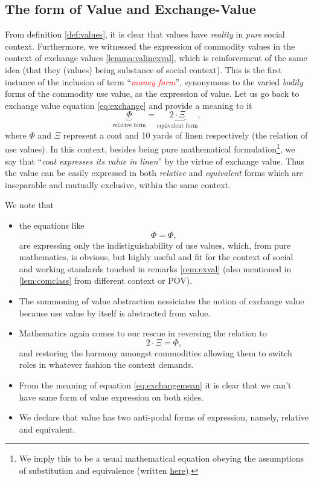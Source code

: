 \documentclass[12pt]{extarticle}
\theoremstyle{definition}
\newenvironment{remark}[1][Remark]{\begin{trivlist}
\item[\hskip \labelsep {\bfseries #1}]}{\end{trivlist}}
\begin{document}
\subsection{The form of Value and Exchange-Value}
From definition \ref{def:values}, it is clear that values have \emph{reality} in \emph{pure} social context.  Furthermore, we witnessed the expression of commodity values in the context of exchange values \ref{lemma:valinexval}, which is reinforcement of the same idea (that they (values) being substance of social context).  This is the first instance of the inclusion of term ``\emph{\textcolor{red}{money form}}'', synonymous to the varied \emph{bodily} forms of the commodity use value,  as the expression of value.  Let us go back to exchange value equation \ref{eq:exchange} and provide a meaning to it
\begin{equation}
  \label{eq:exchangemean}
  \underbrace{\Phi}_{\text{relative form}} = \underbrace{2\cdot\Xi}_{\text{equivalent form}},
\end{equation}
where $\Phi$ and $\Xi$ represent a coat and 10 yards of linen respectively (the relation of use values).  In this context, besides being pure mathematical formulation\footnote{We imply this to be a usual mathematical equation obeying the assumptions of substitution and equivalence (written \href{https://en.wikipedia.org/wiki/Equality_(mathematics)\#Basic_properties}{here}).}, we say that ``\emph{coat expresses its value in linen}'' by the virtue of exchange value.  Thus the value can be easily expressed in both \emph{relative} and \emph{equivalent} forms which are inseparable and mutually exclusive, within the same context.

\begin{remark}
  We note that
  \begin{itemize}
\item the equations like
\begin{equation}
  \label{eq:tuto}
  \Phi = \Phi,
\end{equation}
are expressing only the indistiguishability of use values, which, from pure mathematics, is obvious, but highly useful and fit for the context of social and working standards touched in remarks \ref{rem:exval} (also mentioned in \ref{lem:comclass} from different context or POV).
\item The summoning of value abstraction nessiciates the notion of exchange value because use value by itself is abstracted from value.
\item Mathematics again comes to our rescue in reversing the relation to
  \begin{equation}
    2\cdot\Xi = \Phi,
  \end{equation}
  and restoring the harmony amongst commodities allowing them to switch roles in whatever fashion the context demands.
  \item From the meaning of equation \ref{eq:exchangemean} it is clear that we can't have same form of value expression on both sides.
  \item We declare that value has two anti-podal forms of expression, namely, relative and equivalent.
\end{itemize}
\end{remark}
\end{document}

